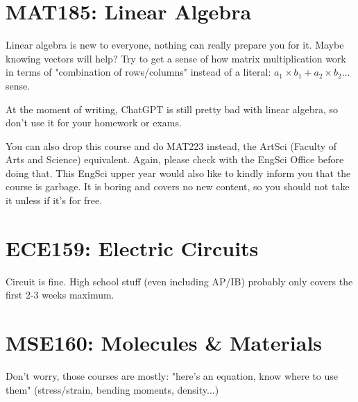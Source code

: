 \section{MAT185: Linear Algebra}

Linear algebra is new to everyone, nothing can really prepare you for it. Maybe knowing vectors will help? Try to get a sense of how matrix multiplication work in terms of "combination of rows/columns" instead of a literal: $a_1\times b_1 + a_2\times b_2\dots$ sense.

At the moment of writing, ChatGPT is still pretty bad with linear algebra, so don't use it for your homework or exams.

You can also drop this course and do MAT223 instead, the ArtSci (Faculty of Arts and Science) equivalent. Again, please check with the EngSci Office before doing that. This EngSci upper year would also like to kindly inform you that the course is garbage. It is boring and covers no new content, so you should not take it unless if it's for free.

\section{ECE159: Electric Circuits}

Circuit is fine. High school stuff (even including AP/IB) probably only covers the first 2-3 weeks maximum.

\section{MSE160: Molecules \& Materials}

Don't worry, those courses are mostly: "here's an equation, know where to use them" (stress/strain, bending moments, density...)
